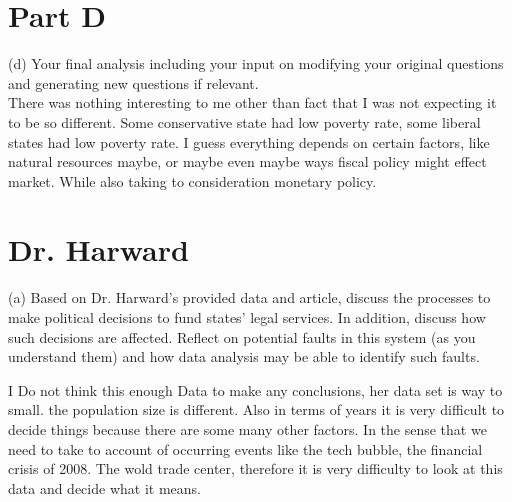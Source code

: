 \documentclass[11pt]{article}
\begin{document}
\section{Part D}
(d) Your final analysis including your input on modifying your original questions and generating new questions if relevant.\\

There was nothing interesting to me other than fact that I was not expecting it to be so different. Some conservative state had low poverty rate, some liberal states had low poverty rate. I guess everything depends on certain factors, like natural resources maybe, or maybe even maybe ways fiscal policy might effect market. While also taking to consideration monetary policy.


\section{ Dr. Harward} 

(a) Based on Dr. Harward’s provided data and article, discuss the processes to make political
decisions to fund states’ legal services. In addition, discuss how such decisions are
affected. Reflect on potential faults in this system (as you understand them) and how data analysis may be able to identify such faults.
 
 
 I Do not think this enough Data to make any conclusions, her data set is way to small. the population size is different. Also in terms of years it is very difficult to decide things because there are some many other factors. In the sense that we need to take to account of occurring events like the tech bubble, the financial crisis of 2008. The wold trade center, therefore it is very difficulty to look at this data and decide what it means. 




\end{document}
